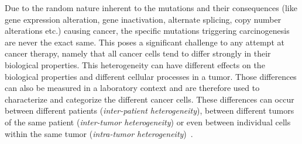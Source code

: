 Due to the random nature inherent to the mutations and their consequences (like gene expression alteration, gene inactivation, alternate splicing, copy number alterations etc.) causing cancer, the specific mutations triggering carcinogenesis are never the exact same.
This poses a significant challenge to any attempt at cancer therapy, namely that all cancer cells tend to differ strongly in their biological properties.
This heterogeneity can have different effects on the biological properties and different cellular processes in a tumor.
Those differences can also be measured in a laboratory context and are therefore used to characterize and categorize the different cancer cells.
These differences can occur between different patients (\textit{inter-patient heterogeneity}), between different tumors of the same patient (\textit{inter-tumor heterogeneity}) or even between individual cells within the same tumor (\textit{intra-tumor heterogeneity})~\cite{heterogeneity-implications-targeted-therapeutics}.\\
